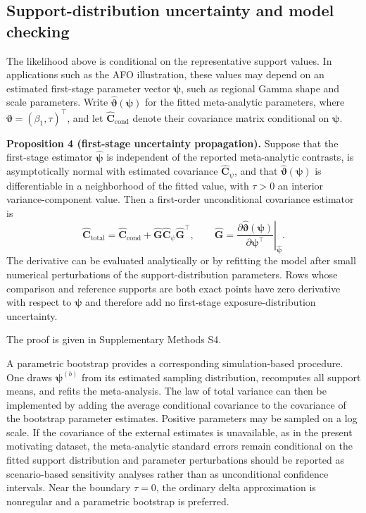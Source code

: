 \documentclass[journal=rsm]{CUP-JNL-DTM}%
\theoremstyle{definition}
\numberwithin{equation}{section}
\begin{document}
\subsection{Support-distribution uncertainty and model checking}
\label{sec:support_uncertainty}

The likelihood above is conditional on the representative support values. In
applications such as the AFO illustration, these values may depend on an
estimated first-stage parameter vector $\boldsymbol\psi$, such as regional
Gamma shape and scale parameters. Write
$\widehat{\boldsymbol\vartheta}(\boldsymbol\psi)$ for the fitted
meta-analytic parameters, where
$\boldsymbol\vartheta=(\beta_1,\tau)^\top$, and let
$\widehat{\mathbf C}_{\mathrm{cond}}$ denote their covariance matrix
conditional on $\boldsymbol\psi$.

\noindent\textbf{Proposition 4 (first-stage uncertainty propagation).}
Suppose that the first-stage estimator $\widehat{\boldsymbol\psi}$ is independent
of the reported meta-analytic contrasts, is asymptotically normal with
estimated covariance $\widehat{\mathbf C}_{\psi}$, and that
$\widehat{\boldsymbol\vartheta}(\boldsymbol\psi)$ is differentiable in a
neighborhood of the fitted value, with $\tau>0$ an interior variance-component
value. Then a first-order unconditional covariance
estimator is
\begin{equation}
 \widehat{\mathbf C}_{\mathrm{total}}
 =\widehat{\mathbf C}_{\mathrm{cond}}
 +\widehat{\mathbf G}\widehat{\mathbf C}_{\psi}
  \widehat{\mathbf G}^{\top},
 \qquad
 \widehat{\mathbf G}
 =\left.
 \frac{\partial\widehat{\boldsymbol\vartheta}(\boldsymbol\psi)}
      {\partial\boldsymbol\psi^\top}
 \right|_{\widehat{\boldsymbol\psi}}.
 \label{eq:delta_support}
\end{equation}
The derivative can be evaluated analytically or by refitting the model after
small numerical perturbations of the support-distribution parameters. Rows
whose comparison and reference supports are both exact points have zero
derivative with respect to $\boldsymbol\psi$ and therefore add no first-stage
exposure-distribution uncertainty.

The proof is given in Supplementary Methods S4.

A parametric bootstrap provides a corresponding simulation-based procedure.
One draws $\boldsymbol\psi^{(b)}$ from its estimated sampling distribution,
recomputes all support means, and refits the meta-analysis. The law of total
variance can then be implemented by adding the average conditional covariance
to the covariance of the bootstrap parameter estimates. Positive parameters
may be sampled on a log scale. If the covariance of the external estimates is
unavailable, as in the present motivating dataset, the meta-analytic standard
errors remain conditional on the fitted support distribution and parameter
perturbations should be reported as scenario-based sensitivity analyses rather
than as unconditional confidence intervals. Near the boundary $\tau=0$, the
ordinary delta approximation is nonregular and a parametric bootstrap is
preferred.
\end{document}
